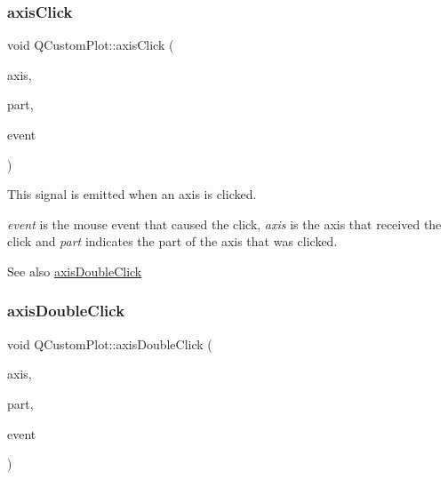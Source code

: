 \subsubsection{\texorpdfstring{axis\+Click}{axisClick}}
{\footnotesize\ttfamily void Q\+Custom\+Plot\+::axis\+Click (\begin{DoxyParamCaption}\item[{\mbox{\hyperlink{class_q_c_p_axis}{Q\+C\+P\+Axis}} $\ast$}]{axis,  }\item[{\mbox{\hyperlink{class_q_c_p_axis_abee4c7a54c468b1385dfce2c898b115f}{Q\+C\+P\+Axis\+::\+Selectable\+Part}}}]{part,  }\item[{Q\+Mouse\+Event $\ast$}]{event }\end{DoxyParamCaption})\hspace{0.3cm}{\ttfamily [signal]}}

This signal is emitted when an axis is clicked.

{\itshape event} is the mouse event that caused the click, {\itshape axis} is the axis that received the click and {\itshape part} indicates the part of the axis that was clicked.

\begin{DoxySeeAlso}{See also}
\mbox{\hyperlink{class_q_custom_plot_a6df35357460181a72da3e93d600f5256}{axis\+Double\+Click}} 
\end{DoxySeeAlso}
\mbox{\label{class_q_custom_plot_a6df35357460181a72da3e93d600f5256}} 
\subsubsection{\texorpdfstring{axis\+Double\+Click}{axisDoubleClick}}
{\footnotesize\ttfamily void Q\+Custom\+Plot\+::axis\+Double\+Click (\begin{DoxyParamCaption}\item[{\mbox{\hyperlink{class_q_c_p_axis}{Q\+C\+P\+Axis}} $\ast$}]{axis,  }\item[{\mbox{\hyperlink{class_q_c_p_axis_abee4c7a54c468b1385dfce2c898b115f}{Q\+C\+P\+Axis\+::\+Selectable\+Part}}}]{part,  }\item[{Q\+Mouse\+Event $\ast$}]{event }\end{DoxyParamCaption})\hspace{0.3cm}{\ttfamily [signal]}}


